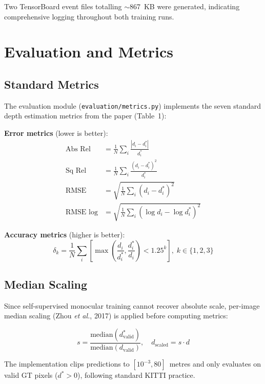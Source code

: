 \documentclass[10pt, a4paper, twocolumn]{article}
\begin{document}
Two TensorBoard event files totalling $\sim$867~KB were generated, indicating comprehensive logging throughout both training runs.

\section{Evaluation and Metrics}
\label{sec:eval}

\subsection{Standard Metrics}

The evaluation module (\texttt{evaluation/metrics.py}) implements the seven standard depth estimation metrics from the paper (Table~1):

\textbf{Error metrics} (lower is better):
\begin{align}
\text{Abs Rel} &= \frac{1}{N}\sum_i \frac{|d_i - d_i^*|}{d_i^*} \\
\text{Sq Rel}  &= \frac{1}{N}\sum_i \frac{(d_i - d_i^*)^2}{d_i^*} \\
\text{RMSE}    &= \sqrt{\frac{1}{N}\sum_i (d_i - d_i^*)^2} \\
\text{RMSE log} &= \sqrt{\frac{1}{N}\sum_i (\log d_i - \log d_i^*)^2}
\end{align}

\textbf{Accuracy metrics} (higher is better):
\begin{equation}
\delta_k = \frac{1}{N}\sum_i \left[\max\!\left(\frac{d_i}{d_i^*}, \frac{d_i^*}{d_i}\right) < 1.25^k\right], \; k \in \{1,2,3\}
\end{equation}

\subsection{Median Scaling}

Since self-supervised monocular training cannot recover absolute scale, per-image median scaling (Zhou \textit{et al.}, 2017) is applied before computing metrics:

\begin{equation}
s = \frac{\text{median}(d^*_{\text{valid}})}{\text{median}(d_{\text{valid}})}, \quad d_{\text{scaled}} = s \cdot d
\end{equation}

The implementation clips predictions to $[10^{-3}, 80]$~metres and only evaluates on valid GT pixels ($d^* > 0$), following standard KITTI practice.
\end{document}
